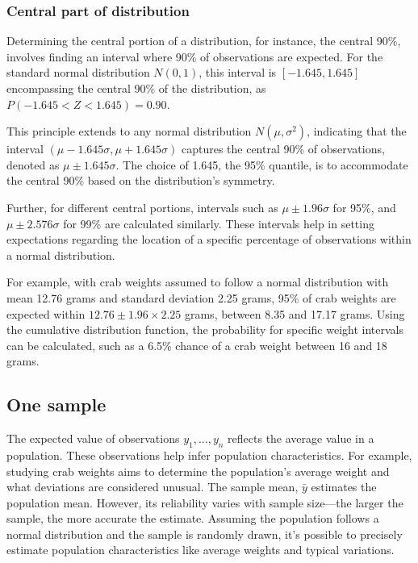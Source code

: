 \documentclass{article}
\begin{document}
\subsubsection{Central part of distribution}
Determining the central portion of a distribution, for instance, the central 90\%, involves finding an interval where 90\% of observations are expected. For the standard normal distribution \(N(0, 1)\), this interval is \([-1.645, 1.645]\) encompassing the central 90\% of the distribution, as \(P(-1.645 < Z < 1.645) = 0.90\).

This principle extends to any normal distribution \(N(\mu, \sigma^2)\), indicating that the interval \((\mu - 1.645\sigma, \mu + 1.645\sigma)\) captures the central 90\% of observations, denoted as \(\mu \pm 1.645\sigma\). The choice of 1.645, the 95\% quantile, is to accommodate the central 90\% based on the distribution's symmetry.

Further, for different central portions, intervals such as \(\mu \pm 1.96\sigma\) for 95\%, and \(\mu \pm 2.576\sigma\) for 99\% are calculated similarly. These intervals help in setting expectations regarding the location of a specific percentage of observations within a normal distribution.

For example, with crab weights assumed to follow a normal distribution with mean 12.76 grams and standard deviation 2.25 grams, 95\% of crab weights are expected within \(12.76 \pm 1.96 \times 2.25\) grams, between 8.35 and 17.17 grams. Using the cumulative distribution function, the probability for specific weight intervals can be calculated, such as a 6.5\% chance of a crab weight between 16 and 18 grams.

\subsection{One sample}

The expected value of observations $y_1, ..., y_n$ reflects the average value in a population. These observations help infer population characteristics. For example, studying crab weights aims to determine the population's average weight and what deviations are considered unusual. The sample mean, $\bar y$ estimates the population mean. However, its reliability varies with sample size—the larger the sample, the more accurate the estimate. Assuming the population follows a normal distribution and the sample is randomly drawn, it's possible to precisely estimate population characteristics like average weights and typical variations.
\end{document}
